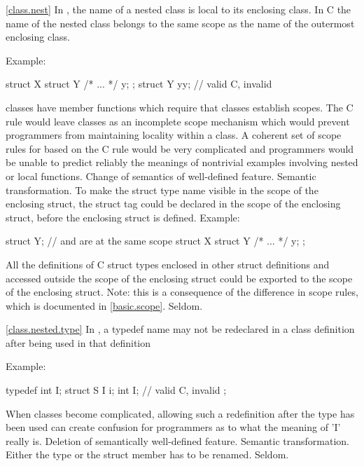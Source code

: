 \ref{class.nest}
\change In \Cpp, the name of a nested class is local to its enclosing class. In C
the name of the nested class belongs to the same scope as the name of the outermost enclosing class.

Example:

\begin{codeblock}
struct X {
  struct Y { /* ... */ } y;
};
struct Y yy;                    // valid C, invalid \Cpp
\end{codeblock}
\rationale
\Cpp classes have member functions which require that classes
establish scopes.
The C rule would leave classes as an incomplete scope mechanism
which would prevent \Cpp programmers from maintaining locality
within a class.
A coherent set of scope rules for \Cpp based on the C rule would
be very complicated and \Cpp programmers would be unable to predict
reliably the meanings of nontrivial examples involving nested or
local functions.
\effect
Change of semantics of well-defined feature.
\difficulty
Semantic transformation.
To make the struct type name visible in the scope of the enclosing
struct, the struct tag could be declared in the scope of the
enclosing struct, before the enclosing struct is defined.
Example:

\begin{codeblock}
struct Y;                       //  and  are at the same scope
struct X {
  struct Y { /* ... */ } y;
};
\end{codeblock}

All the definitions of C struct types enclosed in other struct
definitions and accessed outside the scope of the enclosing
struct could be exported to the scope of the enclosing struct.
Note: this is a consequence of the difference in scope rules,
which is documented in \ref{basic.scope}.
\howwide
Seldom.

\ref{class.nested.type}
\change In \Cpp, a typedef name may not be redeclared in a class definition after being used in that definition

Example:

\begin{codeblock}
typedef int I;
struct S {
  I i;
  int I;                  // valid C, invalid \Cpp
};
\end{codeblock}
\rationale
When classes become complicated, allowing such a redefinition
after the type has been used can create confusion for \Cpp
programmers as to what the meaning of 'I' really is.
\effect
Deletion of semantically well-defined feature.
\difficulty
Semantic transformation.
Either the type or the struct member has to be renamed.
\howwide
Seldom.

